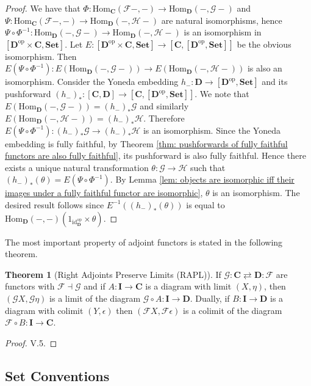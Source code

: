 \documentclass[oneside,11pt]{amsart}
\newcommand{\bC}{\ensuremath{\textbf{C}}}
\newcommand{\bD}{\ensuremath{\textbf{D}}}
\newcommand{\bI}{\ensuremath{\textbf{I}}}
\newcommand{\bSet}{\ensuremath{\textbf{Set}}}
\newcommand{\mF}{\ensuremath{\mathcal{F}}}
\newcommand{\mG}{\ensuremath{\mathcal{G}}}
\newcommand{\mH}{\ensuremath{\mathcal{H}}}
\newcommand{\Hom}{\ensuremath{\text{Hom}}}
\newcommand{\op}{\ensuremath{\text{op}}}
\newcommand{\id}{\ensuremath{\text{id}}}
\theoremstyle{definition}
\newtheorem{proof techniques}{Proof Techniques}
\newtheorem{theorem}{Theorem}
\begin{document}
\begin{proof}
We have that $\Phi : \Hom_\bC( \mF - , -) \to \Hom_\bD( - , \mG -)$ and $\Psi : \Hom_\bC( \mF - , -) \to \Hom_\bD( - , \mH -)$ are natural isomorphisms, hence $\Psi \circ \Phi^{-1} : \Hom_\bD( - , \mG -) \to \Hom_\bD( - , \mH -)$ is an isomorphism in $[\bD^\op \times \bC , \bSet ]$. Let $E : [\bD^\op \times \bC , \bSet ] \to [\bC , [\bD^\op , \bSet]]$ be the obvious isomorphism. Then $E(\Psi \circ \Phi^{-1}) : E(\Hom_\bD( - , \mG -)) \to E(\Hom_\bD( - , \mH -))$ is also an isomorphism.  Consider the Yoneda embedding $h_- : \bD \to [\bD^\op , \bSet]$ and its pushforward $(h_-)_* : [\bC , \bD] \to [\bC , [\bD^\op , \bSet]]$. We note that $E(\Hom_\bD( - , \mG -)) = (h_-)_*\mG$ and similarly $E(\Hom_\bD( - , \mH -)) = (h_-)_*\mH$. Therefore $E(\Psi \circ \Phi^{-1}) : (h_-)_*\mG \to (h_-)_*\mH$ is an isomorphism. Since the Yoneda embedding is fully faithful, by Theorem \ref{thm: pushforwards of fully faithful functors are also fully faithful}, its pushforward is also fully faithful. Hence there exists a unique natural transformation $\theta : \mG \to \mH$ such that $(h_-)_*(\theta) = E(\Psi \circ \Phi^{-1})$. By Lemma \ref{lem: objects are isomorphic iff their images under a fully faithful functor are isomorphic}, $\theta$ is an isomorphism. The desired result follows since $E^{-1}( (h_-)_*(\theta)  )$ is equal to $\Hom_\bD(-  , -) (1_{\id_\bD^\op} \times \theta)$.
\end{proof}

The most important property of adjoint functors is stated in the following theorem. 

\begin{theorem}[Right Adjoints Preserve Limits (RAPL)]
If $\mG: \bC \rightleftarrows \bD : \mF$ are functors with $\mF \dashv \mG$ and if $A : \bI \to \bC$ is a diagram with limit $(X , \eta)$, then $(\mG X , \mG \eta)$ is a limit of the diagram $\mG \circ A : \bI \to \bD$. Dually, if $B : \bI \to \bD$ is a diagram with colimit $(Y , \epsilon)$ then $(\mF X , \mF \epsilon)$ is a colimit of the diagram $\mF \circ B : \bI \to \bC$.
\end{theorem}

\begin{proof}
\cite{maclane2013} V.5. 
\end{proof}





\subsection{Set Conventions} 
\end{document}
